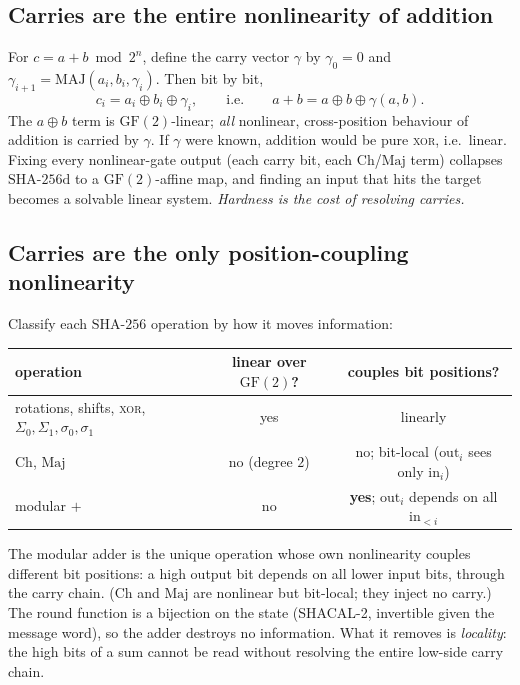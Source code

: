 \documentclass[11pt]{article}
\theoremstyle{remark}
\newcommand{\SHA}{\mathrm{SHA\text{-}256}}
\newcommand{\SHAd}{\mathrm{SHA\text{-}256d}}
\newcommand{\MAJ}{\mathrm{MAJ}}
\newcommand{\Ch}{\mathrm{Ch}}
\newcommand{\Maj}{\mathrm{Maj}}
\begin{document}
\subsection{Carries are the entire nonlinearity of addition}

For $c = a + b \bmod 2^{n}$, define the carry vector $\gamma$ by
$\gamma_0 = 0$ and $\gamma_{i+1} = \MAJ(a_i,b_i,\gamma_i)$. Then bit by
bit,
\[
  c_i = a_i \oplus b_i \oplus \gamma_i,
  \qquad\text{i.e.}\qquad
  a + b = a \oplus b \oplus \gamma(a,b).
\]
The $a\oplus b$ term is $\mathrm{GF}(2)$-linear; \emph{all} nonlinear,
cross-position behaviour of addition is carried by $\gamma$. If $\gamma$
were known, addition would be pure \textsc{xor}, i.e.\ linear. Fixing
every nonlinear-gate output (each carry bit, each $\Ch$/$\Maj$ term)
collapses $\SHAd$ to a $\mathrm{GF}(2)$-affine map, and finding an input
that hits the target becomes a solvable linear system. \emph{Hardness is
the cost of resolving carries.}

\subsection{Carries are the only position-coupling nonlinearity}

Classify each $\SHA$ operation by how it moves information:

\begin{center}
\begin{tabular}{lcc}
\hline
operation & linear over $\mathrm{GF}(2)$? & couples bit positions?\\
\hline
rotations, shifts, \textsc{xor}, $\Sigma_0,\Sigma_1,\sigma_0,\sigma_1$ & yes & linearly\\
$\Ch$, $\Maj$ & no (degree $2$) & no; bit-local ($\text{out}_i$ sees only $\text{in}_i$)\\
modular $+$ & no & \textbf{yes}; $\text{out}_i$ depends on all $\text{in}_{<i}$\\
\hline
\end{tabular}
\end{center}

The modular adder is the unique operation whose own nonlinearity couples
different bit positions: a high output bit depends on all lower input
bits, through the carry chain. ($\Ch$ and $\Maj$ are nonlinear but
bit-local; they inject no carry.) The round function is a bijection on
the state (SHACAL-2, invertible given the message word), so the adder
destroys no information. What it removes is \emph{locality}: the high
bits of a sum cannot be read without resolving the entire low-side carry
chain.
\end{document}
